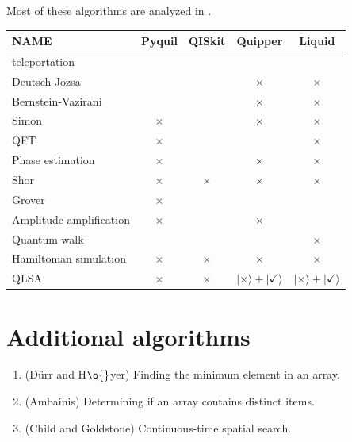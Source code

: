 \documentclass[a4paper,10pt]{article}
\newcommand{\yup}{\checkmark}
\newcommand{\nup}{$\times$}
\newcommand{\nyup}{\mbox{$\ket{\times} + \ket{\yup}$}}
\newcommand{\ket}[1]{| #1 \rangle}
\begin{document}
Most of these algorithms are analyzed in \cite{NC00}.

\bigskip

\begin{tabular}{|l||c|c|c|c||} \hline
NAME						& Pyquil& QISkit& Quipper& Liquid \\ \hline \hline
teleportation 				& \yup	& \yup	& \yup	& \yup \\ \hline \hline
Deutsch-Jozsa				& \yup	& \yup	& \nup	& \nup \\ \hline
Bernstein-Vazirani			& \yup	& \yup	& \nup	& \nup \\ \hline
Simon						& \nup	& \yup	& \nup	& \nup \\ \hline \hline
QFT							& \nup	& \yup	& \yup	& \nup \\ \hline
Phase estimation			& \nup	& \yup	& \nup	& \nup \\ \hline
Shor						& \nup	& \nup	& \nup	& \nup \\ \hline \hline
Grover						& \nup	& \yup	& \yup	& \yup \\ \hline \hline
Amplitude amplification		& \nup	& \yup	& \nup	& \yup \\ \hline \hline
Quantum walk				& \yup	& \yup	& \yup	& \nup \\ \hline \hline
Hamiltonian simulation		& \nup	& \nup	& \nup	& \nup \\ \hline
QLSA						& \nup	& \nup	& \nyup	& \nyup \\ \hline \hline
\end{tabular}

\bigskip

\section{Additional algorithms}

\begin{enumerate}
\item (D\"{u}rr and H$\o{}$yer) Finding the minimum element in an array.

\item (Ambainis) Determining if an array contains distinct items.

\item (Child and Goldstone) Continuous-time spatial search.

\end{enumerate}
\end{document}
